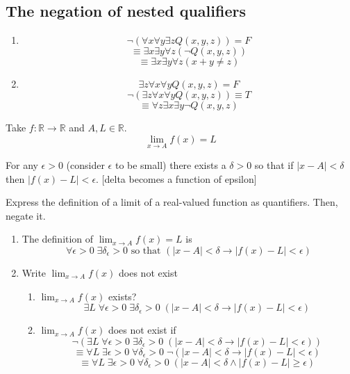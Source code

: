 \documentclass[a4paper, 12pt]{article}
\newenvironment{definition}[1][Definition]{\begin{trivlist}
\item[\hskip \labelsep {\bfseries #1}]}{\end{trivlist}}
\newenvironment{example}[1][Example]{\begin{trivlist}
\item[\hskip \labelsep {\bfseries #1}]}{\end{trivlist}}
\begin{document}
    \subsection*{The negation of nested qualifiers}
    \begin{enumerate}
        \item \[\neg(\forall x \forall y \exists z Q(x, y, z)) = F\]
        \[\equiv \exists x \exists y \forall z (\neg Q(x, y, z))\]
        \[\equiv \exists x \exists y \forall z (x + y \ne z)\]
        \item \[\exists z \forall x \forall y Q(x, y, z) = F\]
        \[\neg(\exists z \forall x \forall y Q(x, y, z)) \equiv T\]
        \[\equiv \forall z \exists x \exists y \neg Q(x, y, z)\]
    \end{enumerate}
    Take $f: \mathbb{R} \rightarrow \mathbb{R}$ and $A, L \in \mathbb{R}$.
    \[\lim_{x \rightarrow A} f(x) = L\]
    \begin{definition}
        For any $\epsilon > 0$ (consider $\epsilon$ to be small) there exists a $\delta > 0$
        so that if $|x - A| < \delta$ then $|f(x) - L| < \epsilon$.
        [delta becomes a function of epsilon]
    \end{definition}
    \begin{example}
        Express the definition of a limit of a real-valued function as quantifiers.
        Then, negate it.
        \begin{enumerate}
            \item The definition of $\lim_{x \rightarrow A} f(x) = L$ is
            \[\forall \epsilon > 0 \; \exists \delta_\epsilon > 0 \text{ so that }
            (|x - A| < \delta \rightarrow |f(x) - L| < \epsilon)\]
            \item Write $\lim_{x \rightarrow A} f(x)$ does not exist
            \begin{enumerate}
                \item $\lim_{x \rightarrow A} f(x)$ exists?
                \[\exists L \; \forall \epsilon > 0 \; \exists \delta_\epsilon > 0 \;
                (|x - A| < \delta \rightarrow |f(x) - L| < \epsilon)\]
                \item $\lim_{x \rightarrow A} f(x)$ does not exist if
                \[\neg(\exists L \; \forall \epsilon > 0 \; \exists \delta_\epsilon > 0 \;
                (|x - A| < \delta \rightarrow |f(x) - L| < \epsilon))\]
                \[\equiv \forall L \; \exists \epsilon > 0 \; \forall \delta_\epsilon > 0 \;
                \neg(|x - A| < \delta \rightarrow |f(x) - L| < \epsilon)\]
                \[\equiv \forall L \; \exists \epsilon > 0 \; \forall \delta_\epsilon > 0 \;
                (|x - A| < \delta \wedge |f(x) - L| \ge \epsilon)\]
            \end{enumerate}
        \end{enumerate}
    \end{example}
\end{document}
